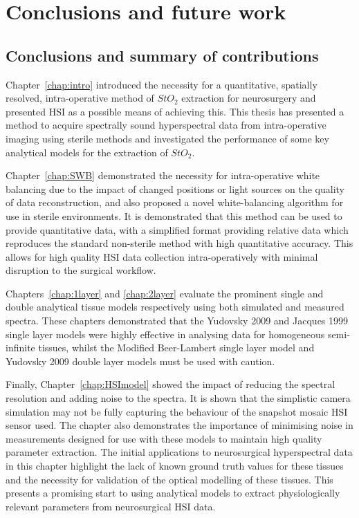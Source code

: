 \chapter{Conclusions and future work}
\label{chap:conclusion}
\minitoc
\section{Conclusions and summary of contributions}
Chapter~\ref{chap:intro} introduced the necessity for a quantitative, spatially resolved, intra-operative method of $StO_2$ extraction for neurosurgery and presented HSI as a possible means of achieving this. This thesis has presented a method to acquire spectrally sound hyperspectral data from intra-operative imaging using sterile methods and investigated the performance of some key analytical models for the extraction of $StO_2$. 

Chapter~\ref{chap:SWB} demonstrated the necessity for intra-operative white balancing due to the impact of changed positions or light sources on the quality of data reconstruction, and also proposed a novel white-balancing algorithm for use in sterile environments. It is demonstrated that this method can be used to provide quantitative data, with a simplified format providing relative data which reproduces the standard non-sterile method with high quantitative accuracy. This allows for high quality HSI data collection intra-operatively with minimal disruption to the surgical workflow. 

Chapters~\ref{chap:1layer} and \ref{chap:2layer} evaluate the prominent single and double analytical tissue models respectively using both simulated and measured spectra. These chapters demonstrated that the Yudovsky 2009 and Jacques 1999 single layer models were highly effective in analysing data for homogeneous semi-infinite tissues, whilst the Modified Beer-Lambert single layer model and Yudovsky 2009 double layer models must be used with caution. 

Finally, Chapter~\ref{chap:HSImodel} showed the impact of reducing the spectral resolution and adding noise to the spectra. It is shown that the simplistic camera simulation may not be fully capturing the behaviour of the snapshot mosaic HSI sensor used. The chapter also demonstrates the importance of minimising noise in measurements designed for use with these models to maintain high quality parameter extraction. The initial applications to neurosurgical hyperspectral data in this chapter highlight the lack of known ground truth values for these tissues and the necessity for validation of the optical modelling of these tissues. This presents a promising start to using analytical models to extract physiologically relevant parameters from neurosurgical HSI data. 

